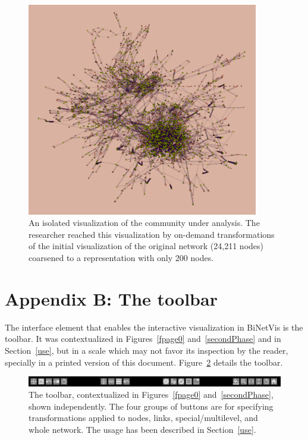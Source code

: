 \documentclass[runningheads]{llncs}
\begin{document}
\begin{figure}\centering
 \includegraphics[width=0.9\textwidth]{05}
  \caption{An isolated visualization of the community under analysis.
  The researcher reached this visualization by on-demand transformations of the initial visualization of the original network (24,211 nodes) coarsened to a representation with only 200 nodes.}\label{amlf}
\end{figure}



\FloatBarrier
\section*{Appendix B: The toolbar}
The interface element that enables the interactive visualization in BiNetVis is the toolbar. It was contextualized in Figures~\ref{fpage0} and~\ref{secondPhase} and in Section~\ref{use},
but in a scale which may not favor its inspection by the reader, specially in a printed version of this document.
Figure~\ref{toolbar} details the toolbar.


\begin{figure}\centering
 \includegraphics[width=\textwidth]{toolbar}
  \caption{The toolbar, contextualized in Figures~\ref{fpage0} and~\ref{secondPhase}, shown independently. The four groups of buttons are for specifying transformations applied to nodes, links, special/multilevel, and whole network. The usage has been described in Section~\ref{use}.}\label{toolbar}
\end{figure}
\end{document}

